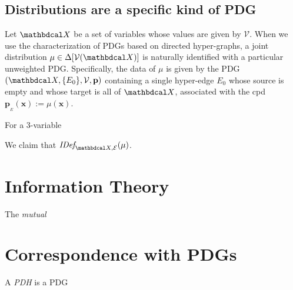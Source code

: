 \documentclass{article}
\theoremstyle{plain}
\theoremstyle{definition}
\theoremstyle{remark}
\let\H\relax
\DeclareMathOperator{\H}{\mathrm{H}} %
\newcommand{\mat}[1]{\mathbf{#1}}
\newcommand{\bp}[1][L]{\mat{p}_{\!_{#1}\!}}
\newcommand{\V}{\mathcal V}
\newcommand{\N}{\mathbdcal X}
\newcommand{\Ed}{\mathcal E}
\newcommand{\IDef}[1]{\mathit{IDef}_{\!#1}}
\begin{document}
	\subsection*{Distributions are a specific kind of PDG}
	Let $\N$ be a set of variables whose values are given by $\V$. When we use the characterization of PDGs based on directed hyper-graphs, a joint distribution $\mu \in \Delta[\V(\N)]$ is naturally identified with a particular unweighted PDG. Specifically, the data of $\mu$ is given by the PDG $(\N, \{ E_0 \}, \V, \mat p)$ containing a single hyper-edge $E_0$ whose source is empty and whose target is all of $\N$, associated with the cpd $\bp[E](\mat x) := \mu(\mat x)$. 
	
	\begin{example}
		For a 3-variable
	\end{example}
	
	We claim that $\IDef{\N,\Ed}(\mu)$. 
	\newpage
	\appendix
	\section{Information Theory} \label{apx:info}
	\begin{defn}
		The \emph{mutual}
	\end{defn}
	\section{Correspondence with PDGs} \label{apx:hyper-vs-graph}
	\begin{defn}
		A \emph{PDH} is a PDG 
	\end{defn}
	
	
	
	
	
\end{document}

